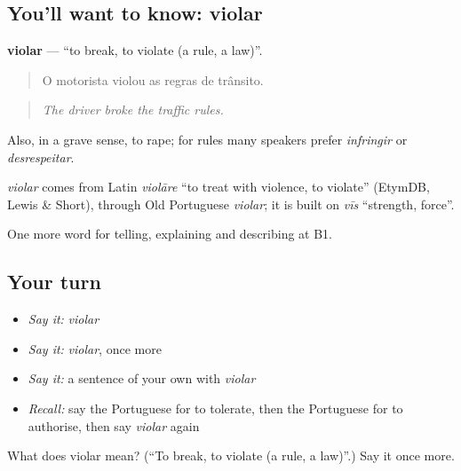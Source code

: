 \subsection*{You'll want to know: violar}
\textbf{violar} — \textquotedblleft{}to break, to violate (a rule, a law)\textquotedblright{}.

\begin{quote}
O motorista violou as regras de trânsito.
\end{quote}

\begin{quote}
\emph{The driver broke the traffic rules.}
\end{quote}

Also, in a grave sense, to rape; for rules many speakers prefer \emph{infringir} or \emph{desrespeitar}.

\begin{cousinweb}
\emph{violar} comes from Latin \emph{violāre} \textquotedblleft{}to treat with violence, to violate\textquotedblright{} (EtymDB, Lewis \& Short), through Old Portuguese \emph{violar}; it is built on \emph{vīs} \textquotedblleft{}strength, force\textquotedblright{}.
\end{cousinweb}

\begin{grammarlens}[title={What you've built}]
One more word for telling, explaining and describing at B1.
\end{grammarlens}

\subsection*{Your turn}
\begin{itemize}
\raggedright
  \item \emph{Say it:} \emph{violar}
  \item \emph{Say it:} \emph{violar}, once more
  \item \emph{Say it:} a sentence of your own with \emph{violar}
  \item \emph{Recall:} say the Portuguese for to tolerate, then the Portuguese for to authorise, then say \emph{violar} again
\end{itemize}

\begin{tcolorbox}[breakable,colback=teal!4,colframe=teal!35!black,title={Before you move on}]
What does violar mean? (\textquotedblleft{}To break, to violate (a rule, a law)\textquotedblright{}.) Say it once more.
\end{tcolorbox}
